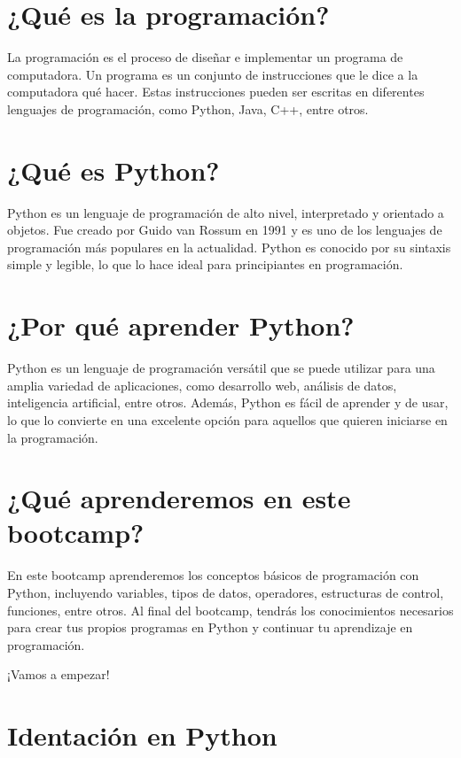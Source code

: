 \documentclass[
  a4paper,
  DIV=11,
  numbers=noendperiod,
  onepage,
  openany]{scrreprt}
\begin{document}
\section{¿Qué es la programación?}\label{quuxe9-es-la-programaciuxf3n}

La programación es el proceso de diseñar e implementar un programa de
computadora. Un programa es un conjunto de instrucciones que le dice a
la computadora qué hacer. Estas instrucciones pueden ser escritas en
diferentes lenguajes de programación, como Python, Java, C++, entre
otros.

\section{¿Qué es Python?}\label{quuxe9-es-python}

Python es un lenguaje de programación de alto nivel, interpretado y
orientado a objetos. Fue creado por Guido van Rossum en 1991 y es uno de
los lenguajes de programación más populares en la actualidad. Python es
conocido por su sintaxis simple y legible, lo que lo hace ideal para
principiantes en programación.

\section{¿Por qué aprender Python?}\label{por-quuxe9-aprender-python}

Python es un lenguaje de programación versátil que se puede utilizar
para una amplia variedad de aplicaciones, como desarrollo web, análisis
de datos, inteligencia artificial, entre otros. Además, Python es fácil
de aprender y de usar, lo que lo convierte en una excelente opción para
aquellos que quieren iniciarse en la programación.

\section{¿Qué aprenderemos en este
bootcamp?}\label{quuxe9-aprenderemos-en-este-bootcamp}

En este bootcamp aprenderemos los conceptos básicos de programación con
Python, incluyendo variables, tipos de datos, operadores, estructuras de
control, funciones, entre otros. Al final del bootcamp, tendrás los
conocimientos necesarios para crear tus propios programas en Python y
continuar tu aprendizaje en programación.

¡Vamos a empezar!

\section{Identación en Python}\label{identaciuxf3n-en-python}
\end{document}
